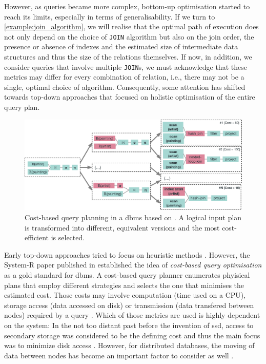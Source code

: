 However, as queries became more complex, bottom-up optimisation started to reach its limits, especially in terms of generalisability. If we turn to \cref{example:join_algorithm}, we will realise that the optimal path of execution does not only depend on the choice of \texttt{JOIN} algorithm but also on the join order, the presence or absence of indexes and the estimated size of intermediate data structures and thus the size of the relations themselves. If now, in addition, we consider queries that involve multiple \texttt{JOIN}s, we must acknowledge that these metrics may differ for every combination of relation, i.e., there may not be a single, optimal choice of algorithm. Consequently, some attention has shifted towards top-down approaches that focused on holistic optimisation of the entire query plan.

\begin{figure}[tb]
    \centering
    \includegraphics[width=\textwidth]{figures/query-planning.eps}
    \caption{Cost-based query planning in a \acrshort{dbms} based on . A logical input plan is transformed into different, equivalent versions and the most cost-efficient is selected.}
    \label{figure:query_planning}
\end{figure}

Early top-down approaches tried to focus on heuristic methods \cite{Jarke:1984Query}. However, the System-R paper \cite{Selinger:1979Access} published in \citeyear{Selinger:1979Access} established the idea of \emph{cost-based query optimisation} as a gold standard for \acrshort{dbms}. A cost-based query planner enumerates phyisical plans that employ different strategies and selects the one that minimises the estimated cost. Those costs may involve computation (time used on a CPU), storage access (data accessed on disk) or transmission (data transfered between nodes) required by a query \cite{Jarke:1984Query,Garcia:2009Database}. Which of those metrics are used is highly dependent on the system: In the not too distant past before the invention of \acrfull{ssd}, access to secondary storage was considered to be the defining cost and thus the main focus was to minimize disk access \cite{Garcia:2009Database}. However, for distributed databases, the moving of data between nodes has become an important factor to consider as well \cite{Bruno2013:Continuous}.

